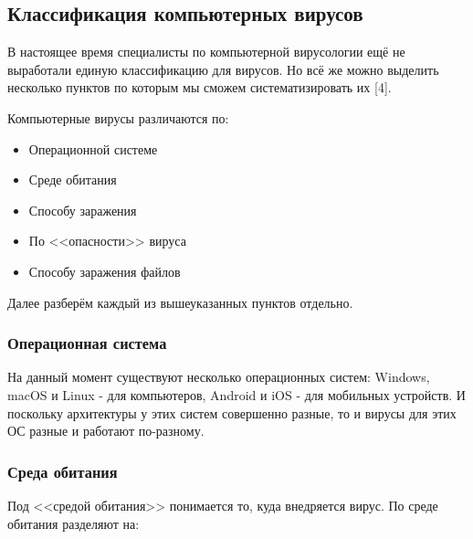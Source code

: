 \documentclass[12pt]{article}
\begin{document}
\subsection*{Классификация компьютерных вирусов}

В настоящее время специалисты по компьютерной вирусологии ещё не выработали единую классификацию для вирусов. Но всё же можно выделить несколько пунктов по которым мы сможем систематизировать их [4].

Компьютерные вирусы различаются по:

\begin{itemize}
    \item Операционной системе
    \item Среде обитания
    \item Способу заражения
    \item По <<опасности>> вируса
    \item Способу заражения файлов
\end{itemize}

Далее разберём каждый из вышеуказанных пунктов отдельно.

\subsubsection*{Операционная система}
На данный момент существуют несколько операционных систем: Windows, macOS и Linux - для компьютеров, Android и iOS - для мобильных устройств. И поскольку архитектуры у этих систем совершенно разные, то и вирусы для этих ОС разные и работают по-разному.

\subsubsection*{Среда обитания}
Под <<средой обитания>> понимается то, куда внедряется вирус. По среде обитания разделяют на:
\end{document}
